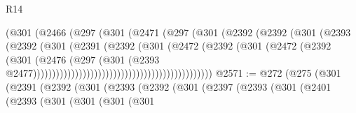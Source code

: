 \begin{lexlean}{R14}
\begin{coremodule}
                                              (@301
                                                (@2466
                                                  (@297
                                                    (@301
                                                      (@2471
                                                        (@297
                                                          (@301
                                                            (@2392
                                                              (@2392
                                                                (@301
                                                                  (@2393
                                                                    (@2392
                                                                      (@301
                                                                        (@2391
                                                                          (@2392
                                                                            (@301
                                                                              (@2472
                                                                                (@2392
                                                                                  (@301
                                                                                    (@2472
                                                                                      (@2392
                                                                                        (@301
                                                                                          (@2476
                                                                                            (@297
                                                                                              (@301
                                                                                                (@2393
                                                                                                  @2477)))))))))))))))))))))))))))))))))))))))))))))))
@2571 := @272
    (@275
      (@301
        (@2391
          (@2392
            (@301
              (@2393
                (@2392
                  (@301
                    (@2397
                      (@2393
                        (@301
                          (@2401
                            (@2393
                              (@301
                                (@301
                                  (@301
                                    (@301

\end{coremodule}
\end{lexlean}
